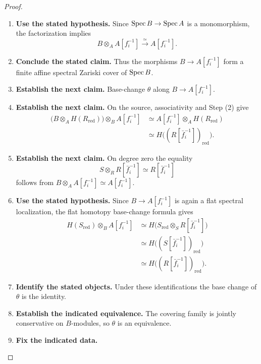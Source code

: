 \begin{proof}
\begin{enumerate}[label=\textup{(\arabic*)}]
    \(f_i\in R\) such that
    \[
    D_A^{\mathrm{sp}}(f_i)\longrightarrow\Spec A
    \]
    factors through \(\Spec B\), and the resulting family covers \(\Spec B\).
    \item \textbf{Use the stated hypothesis.}
    Since \(\operatorname{Spec} B\to\operatorname{Spec} A\) is a monomorphism, the factorization implies
    \[
    B\otimes_AA[f_i^{-1}]
    \xrightarrow{\simeq}
    A[f_i^{-1}].
    \]
    \item \textbf{Conclude the stated claim.}
    Thus the morphisms \(B\to A[f_i^{-1}]\) form a finite affine spectral
    Zariski cover of \(\Spec B\).
    \item \textbf{Establish the next claim.}
    Base-change \(\theta\) along \(B\to A[f_i^{-1}]\).
    \item \textbf{Establish the next claim.}
    On the source,
    associativity and Step \textup{(2)} give
    \[
    \begin{aligned}
    \bigl(B\otimes_AH(R_{\mathrm{red}})\bigr)
    \otimes_BA[f_i^{-1}]
    &\simeq
    A[f_i^{-1}]\otimes_AH(R_{\mathrm{red}})\\
    &\simeq
    H\bigl((R[\bar f_i^{-1}])_{\mathrm{red}}\bigr).
    \end{aligned}
    \]
    \item \textbf{Establish the next claim.}
    On degree zero the equality
    \[
    S\otimes_RR[\bar f_i^{-1}]
    \simeq
    R[\bar f_i^{-1}]
    \]
    follows from
    \(B\otimes_AA[f_i^{-1}]\simeq A[f_i^{-1}]\).
    \item \textbf{Use the stated hypothesis.}
    Since
    \(B\to A[f_i^{-1}]\) is again a flat spectral localization, the flat homotopy
    base-change formula gives
    \[
    \begin{aligned}
    H(S_{\mathrm{red}})
    \otimes_BA[f_i^{-1}]
    &\simeq
    H\bigl(
    S_{\mathrm{red}}\otimes_SR[\bar f_i^{-1}]
    \bigr)\\
    &\simeq
    H\bigl((S[\bar f_i^{-1}])_{\mathrm{red}}\bigr)\\
    &\simeq
    H\bigl((R[\bar f_i^{-1}])_{\mathrm{red}}\bigr).
    \end{aligned}
    \]
    \item \textbf{Identify the stated objects.}
    Under these identifications the base change of \(\theta\) is the identity.
    \item \textbf{Establish the indicated equivalence.}
    The covering family is jointly conservative on \(B\)-modules, so
    \(\theta\) is an equivalence.
    \item \textbf{Fix the indicated data.}

\end{enumerate}
\end{proof}
